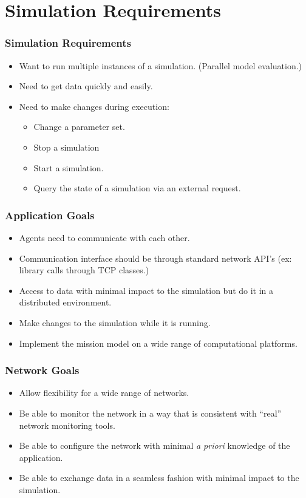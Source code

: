 \documentclass{beamer}
\begin{document}
\section{Simulation Requirements}

\begin{frame}
  \frametitle{Simulation Requirements}

  \begin{itemize}
  \item Want to run multiple instances of a simulation. (Parallel
    model evaluation.)
  \item Need to get data quickly and easily.
  \item Need to make changes during execution:
    \begin{itemize}
    \item Change a parameter set.
    \item Stop a simulation
    \item Start a simulation.
    \item Query the state of a simulation via an external request.
    \end{itemize}
  \end{itemize}

\end{frame}


\begin{frame}
  \frametitle{Application Goals}

  \begin{itemize}
  \item Agents need to communicate with each other.
  \item Communication interface should be through standard network
    API's (ex: library calls through TCP classes.)
  \item Access to data with minimal impact to the simulation but do it
    in a distributed environment.
  \item Make changes to the simulation while it is running.
  \item Implement the mission model on a wide range of computational
    platforms.
  \end{itemize}


\end{frame}

\begin{frame}
  \frametitle{Network Goals}

  \begin{itemize}
  \item Allow flexibility for a wide range of networks.
  \item Be able to monitor the network in a way that is consistent
    with ``real'' network monitoring tools.
  \item Be able to configure the network with minimal \textit{a
      priori} knowledge of the application.
  \item Be able to exchange data in a seamless fashion with minimal
    impact to the simulation.
  \end{itemize}

\end{frame}
\end{document}
